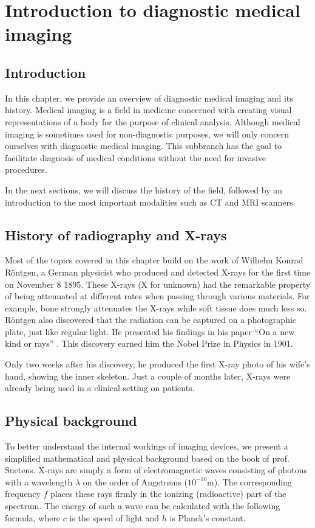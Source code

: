 \chapter{Introduction to diagnostic medical imaging}

\section{Introduction}
In this chapter, we provide an overview of diagnostic medical imaging and its
history. Medical imaging is a field in medicine concerned with creating visual
representations of a body for the purpose of clinical analysis. Although medical
imaging is sometimes used for non-diagnostic purposes, we will only concern
ourselves with diagnostic medical imaging. This subbranch has the goal to
facilitate diagnosis of medical conditions without the need for invasive
procedures.

In the next sections, we will discuss the history of the field, followed by an
introduction to the most important modalities such as CT and MRI scanners.

\section{History of radiography and X-rays}
Most of the topics covered in this chapter build on the work of Wilhelm Konrad
R\"ontgen, a German physicist who produced and detected X-rays for the first
time on November 8 1895. These X-rays (X for unknown) had the remarkable
property of being attenuated at different rates when passing through various
materials. For example, bone strongly attenuates the X-rays while soft tissue
does much less so. R\"ontgen also discovered that the radiation can be captured
on a photographic plate, just like regular light. He presented his findings in
his paper ``On a new kind or rays'' \cite{rontgen}. This discovery earned him
the Nobel Prize in Physics in 1901.

Only two weeks after his discovery, he produced the first X-ray photo of his
wife's hand, showing the inner skeleton. Just a couple of months later, X-rays
were already being used in a clinical setting on patients.

\section{Physical background}
To better understand the internal workings of imaging devices, we present a
simplified mathematical and physical background based on the book of prof.
Suetens\cite{suetens}. X-rays are simply a form of electromagnetic waves
consisting of photons with a wavelength $\lambda$ on the order of Angstr\o ms
($10^{-10}$m). The corresponding frequency $f$ places these rays firmly in the
ionizing (radioactive) part of the spectrum. The energy of such a wave can be
calculated with the following formula, where $c$ is the speed of light and $h$
is Planck's constant.

